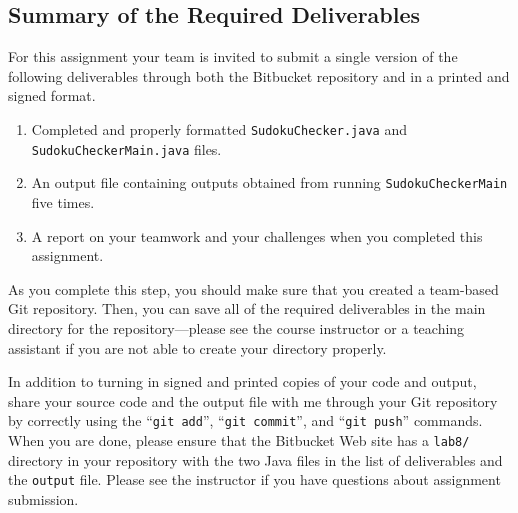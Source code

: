 \vspace{-0.25in}
\subsection*{Summary of the Required Deliverables}
\vspace{-0.05in}

For this assignment your team is invited to submit a single version of the following deliverables through both the
Bitbucket repository and in a printed and signed format.

\vspace{-0.1in}
\begin{enumerate}
    \setlength{\itemsep}{0pt}
  \item Completed and properly formatted {\tt SudokuChecker.java} and {\tt SudokuCheckerMain.java} files.

  \item An output file containing outputs obtained from running {\tt SudokuCheckerMain} five times.

  \item A report on your teamwork and your challenges when you completed this assignment.

\end{enumerate}
\vspace{-0.075in}

\noindent As you complete this step, you should make sure that you created a team-based Git repository. Then, you can
save all of the required deliverables in the main directory for the repository---please see the course instructor or a
teaching assistant if you are not able to create your directory properly.

In addition to turning in signed and printed copies of your code and output, share your source code and the output
file with me through your Git repository by correctly using the ``{\tt git add}'', ``{\tt git commit}'', and ``{\tt git
  push}'' commands. When you are done, please ensure that the Bitbucket Web site has a {\tt lab8/} directory in your
repository with the two Java files in the list of deliverables and the {\tt output} file. Please see the instructor
if you have questions about assignment submission.


